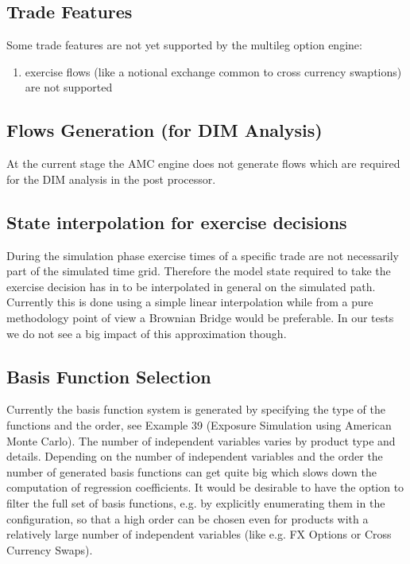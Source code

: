 \subsection*{Trade Features}

Some trade features are not yet supported by the multileg option engine:

\begin{enumerate}
\item exercise flows (like a notional exchange common to cross currency swaptions) are not supported
\end{enumerate}

\subsection*{Flows Generation (for DIM Analysis)}

At the current stage the AMC engine does not generate flows which are required for the DIM analysis in the post
processor.

\subsection*{State interpolation for exercise decisions}

During the simulation phase exercise times of a specific trade are not necessarily part of the simulated time
grid. Therefore the model state required to take the exercise decision has in to be interpolated in general on the
simulated path. Currently this is done using a simple linear interpolation while from a pure methodology point of view a
Brownian Bridge would be preferable. In our tests we do not see a big impact of this approximation though.

\subsection*{Basis Function Selection}

Currently the basis function system is generated by specifying the type of the functions and the order, see
Example 39 (Exposure Simulation using American Monte Carlo).
The number of independent variables varies by product type and details. Depending on
the number of independent variables and the order the number of generated basis functions can get quite big which slows
down the computation of regression coefficients. It would be desirable to have the option to filter the full set of
basis functions, e.g. by explicitly enumerating them in the configuration, so that a high order can be chosen even for
products with a relatively large number of independent variables (like e.g. FX Options or Cross Currency Swaps).

